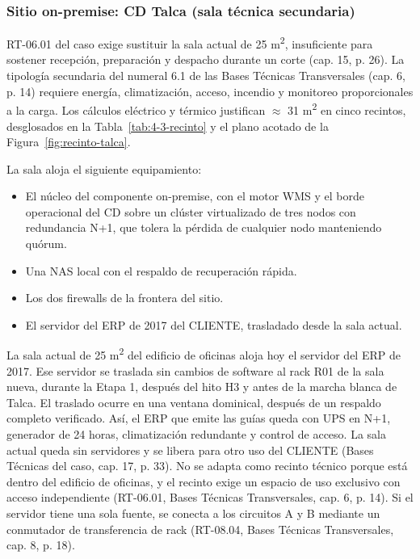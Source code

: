 \subsubsection{Sitio on-premise: CD Talca (sala técnica secundaria)}
\label{subsec:sitio-on-premise-talca}

RT-06.01 del caso exige sustituir la sala actual de 25 m\textsuperscript{2}, insuficiente para sostener recepción, preparación y despacho durante un corte (cap. 15, p. 26). La tipología secundaria del numeral 6.1 de las Bases Técnicas Transversales (cap. 6, p. 14) requiere energía, climatización, acceso, incendio y monitoreo proporcionales a la carga. Los cálculos eléctrico y térmico justifican $\approx$ 31 m\textsuperscript{2} en cinco recintos, desglosados en la Tabla~\ref{tab:4-3-recinto} y el plano acotado de la Figura~\ref{fig:recinto-talca}.

La sala aloja el siguiente equipamiento:

\begin{itemize}
  \item El núcleo del componente on-premise, con el motor WMS y el borde operacional del CD sobre un clúster virtualizado de tres nodos con redundancia N+1, que tolera la pérdida de cualquier nodo manteniendo quórum.
  \item Una NAS local con el respaldo de recuperación rápida.
  \item Los dos firewalls de la frontera del sitio.
  \item El servidor del ERP de 2017 del CLIENTE, trasladado desde la sala actual.
\end{itemize}

La sala actual de 25 m\textsuperscript{2} del edificio de oficinas aloja hoy el servidor del ERP de 2017. Ese servidor se traslada sin cambios de software al rack R01 de la sala nueva, durante la Etapa 1, después del hito H3 y antes de la marcha blanca de Talca. El traslado ocurre en una ventana dominical, después de un respaldo completo verificado. Así, el ERP que emite las guías queda con UPS en N+1, generador de 24 horas, climatización redundante y control de acceso. La sala actual queda sin servidores y se libera para otro uso del CLIENTE (Bases Técnicas del caso, cap. 17, p. 33). No se adapta como recinto técnico porque está dentro del edificio de oficinas, y el recinto exige un espacio de uso exclusivo con acceso independiente (RT-06.01, Bases Técnicas Transversales, cap. 6, p. 14). Si el servidor tiene una sola fuente, se conecta a los circuitos A y B mediante un conmutador de transferencia de rack (RT-08.04, Bases Técnicas Transversales, cap. 8, p. 18).

